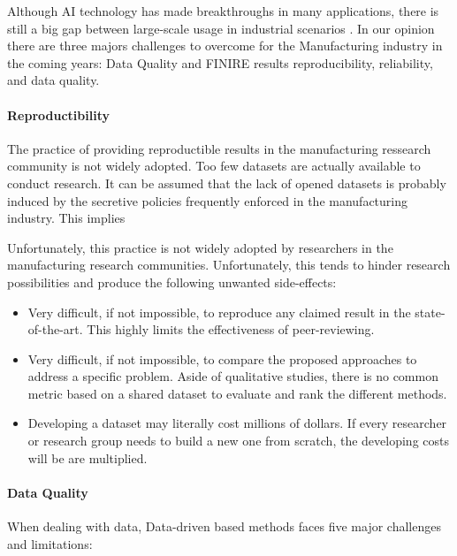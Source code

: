 Although AI technology has made breakthroughs in many applications, there is still a big gap between large-scale usage in industrial scenarios \citep{lee2020industrial}. In our opinion there are three majors challenges to overcome for the Manufacturing industry in the coming years: Data Quality and FINIRE results reproducibility, reliability, and data quality.

\paragraph{Reproductibility}


The practice of providing reproductible results in the manufacturing ressearch community is not widely adopted. Too few datasets are actually available to conduct research. It can be assumed that
the lack of opened datasets is probably induced by the secretive policies frequently enforced in the manufacturing industry. This implies

Unfortunately, this practice is not widely adopted by researchers in the manufacturing research
communities.  Unfortunately, this tends to hinder research possibilities and produce the following unwanted side-effects:

\begin{itemize}
    \item Very difficult, if not impossible, to reproduce any claimed result in the state-of-the-art. This highly limits the effectiveness of peer-reviewing.
    \item Very difficult, if not impossible, to compare the proposed approaches to address a specific problem. Aside of qualitative studies, there is no common metric based on a shared dataset to evaluate and rank the different methods.
    \item Developing a dataset may literally cost millions of dollars. If every researcher or research group needs to build a new one from scratch, the developing costs will be are multiplied.
\end{itemize}


\paragraph{Data Quality}

When dealing with data, Data-driven based methods faces five major challenges and limitations:


